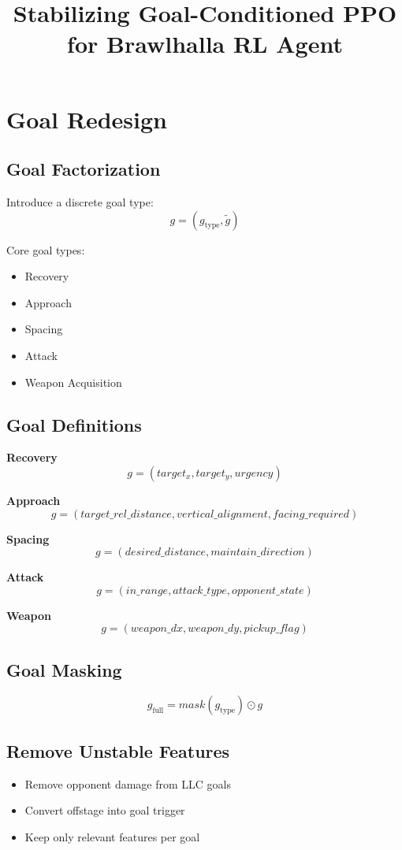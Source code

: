 \documentclass[11pt]{article}
\title{Stabilizing Goal-Conditioned PPO for Brawlhalla RL Agent}
\date{}
\begin{document}
\maketitle

\section{Goal Redesign}

\subsection{Goal Factorization}
Introduce a discrete goal type:
\[
g = (g_{\text{type}}, \tilde{g})
\]

Core goal types:
\begin{itemize}[noitemsep]
\item Recovery
\item Approach
\item Spacing
\item Attack
\item Weapon Acquisition
\end{itemize}

\subsection{Goal Definitions}

\textbf{Recovery}
\[
g = (target_x, target_y, urgency)
\]

\textbf{Approach}
\[
g = (target\_rel\_distance, vertical\_alignment, facing\_required)
\]

\textbf{Spacing}
\[
g = (desired\_distance, maintain\_direction)
\]

\textbf{Attack}
\[
g = (in\_range, attack\_type, opponent\_state)
\]

\textbf{Weapon}
\[
g = (weapon\_dx, weapon\_dy, pickup\_flag)
\]

\subsection{Goal Masking}
\[
g_{\text{full}} = mask(g_{\text{type}}) \odot g
\]

\subsection{Remove Unstable Features}
\begin{itemize}[noitemsep]
\item Remove opponent damage from LLC goals
\item Convert offstage into goal trigger
\item Keep only relevant features per goal
\end{itemize}
\end{document}
